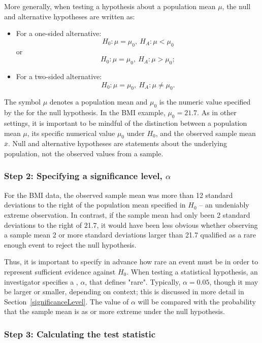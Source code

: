 \begin{spacing}{1.5}
More generally, when testing a hypothesis about a population mean $\mu$, the null and alternative hypotheses are written as:

\begin{itemize}
	\item For a one-sided alternative: \[H_0: \mu = \mu_0, \ H_A: \mu < \mu_0\] or \[H_0: \mu = \mu_0, \  H_A: \mu > \mu_0;\]
	
	\item For a two-sided alternative: \[H_0: \mu = \mu_0, \ H_A: \mu \neq \mu_0.\]
\end{itemize}


The symbol $\mu$ denotes a population mean and $\mu_0$ is the numeric value specified by the for the null hypothesis. In the BMI example, $\mu_0 = 21.7$.  As in other settings, it is important to be mindful of the distinction between a population mean $\mu$, its specific numerical value $\mu_0$ under $H_0$,  and the observed sample mean $\overline{x}$.  Null and alternative hypotheses are statements about the underlying population, not the observed values from a sample.

\subsubsection{Step 2: Specifying a significance level, $\alpha$}

For the  BMI data, the observed sample mean was more than 12 standard deviations to the right of the population mean specified in $H_0$ -- an undeniably extreme observation. In contrast, if the sample mean had only been 2 standard deviations to the right of 21.7, it would have been less obvious whether observing a sample mean 2 or more standard deviations larger than 21.7 qualified as a rare enough event to reject the null hypothesis. 

Thus, it is important to specify in advance how rare an event must be in order to represent sufficient evidence against $H_0$. When testing a statistical hypothesis, an investigator specifies a , $\alpha$, that defines "rare". Typically, $\alpha = 0.05$, though it may be larger or smaller, depending on context; this is discussed in more detail in Section~\ref{significanceLevel}. The value of $\alpha$ will be compared with the probability that the sample mean is as or more extreme under the null hypothesis.

\subsubsection{Step 3: Calculating the test statistic}


\end{spacing}
